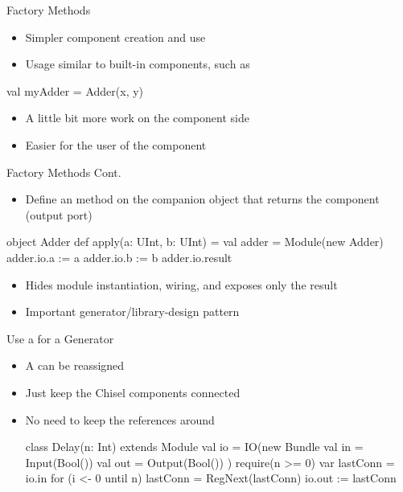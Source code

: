 \begin{frame}[fragile]{Factory Methods}
\begin{itemize}
\item Simpler component creation and use
\item Usage similar to built-in components, such as 
\end{itemize}
\begin{chisel}
val myAdder = Adder(x, y)
\end{chisel}
\begin{itemize}
\item A little bit more work on the component side
\item Easier for the user of the component
\end{itemize}
\end{frame}

\begin{frame}[fragile]{Factory Methods Cont.}
\begin{itemize}
\item Define an  method on the companion object that returns the component (output port)
\end{itemize}
\begin{chisel}
object Adder {
  def apply(a: UInt, b: UInt) = {
    val adder = Module(new Adder)
    adder.io.a := a
    adder.io.b := b
    adder.io.result
  }
}
\end{chisel}
\begin{itemize}
\item Hides module instantiation, wiring, and exposes only the result
\item Important generator/library-design pattern
\end{itemize}
\end{frame}



\begin{frame}[fragile]{Use a  for a Generator}
\begin{itemize}
\item A  can be reassigned
\item Just keep the Chisel components connected
\item No need to keep the references around
\begin{chisel}
class Delay(n: Int) extends Module {
    val io = IO(new Bundle {
        val in  = Input(Bool())
        val out = Output(Bool())
    })
    require(n >= 0)
    var lastConn = io.in
    for (i <- 0 until n)
        lastConn = RegNext(lastConn)
    io.out := lastConn
}
\end{chisel}
\end{itemize}
\end{frame}

